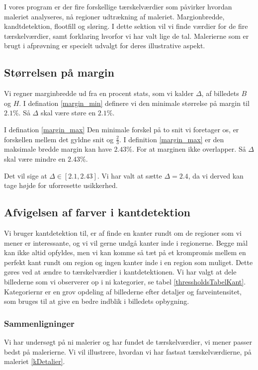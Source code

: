{\sffamily
I vores program er der fire forskellige tærskelværdier som påvirker
hvordan maleriet analyseres, nå regioner udtrækning af maleriet.
Margionbredde, kandtdetektion, flootfill og sløring. I dette sektion vil
vi finde værdier for de fire tærskelværdier, samt forklaring hvorfor vi
har valt lige de tal. Malerierne som er brugt i afprøvning er specielt
udvalgt for deres illustrative aspekt. 
}

\subsection{Størrelsen på margin}
Vi regner marginbredde ud fra en procent stats, som vi kalder $\Delta$, af
billedets $B$ og $H$. I defination \ref{margin_min} definere vi den
minimale størrelse på margin til $2.1 \%$. Så $\Delta$ skal være støre en
$2.1 \%$. 

I defination \ref{margin_max}
Den minimale forskel på to snit vi foretager os, er forskellen mellem
det gyldne snit og $\frac{2}{3}$. I definition \ref{margin_max} er den
maksimale bredde margin kan have $2.43\%$. For at marginen ikke
overlapper. Så $\Delta$ skal være mindre en $2.43\%$. 

Det vil sige at $\Delta \in [2.1, 2.43]$. Vi har valt at
sætte $\Delta = 2.4$, da vi derved kan tage højde for uforresette
usikkerhed.

\subsection{Afvigelsen af farver i kantdetektion}
Vi bruger kantdetektion til, er af finde en kanter rundt om de regioner
som vi mener er interessante, og vi vil gerne undgå kanter inde i
regionerne. Begge mål kan ikke altid opfyldes, men vi kan komme så tæt
på et krompromis mellem en perfekt kant rundt om region og ingen kanter
inde i en region som muliget. Dette gøres ved at ændre to tærskelværdier
i kantdetektionen. Vi har valgt at dele billederne som vi observerer op
i ni kategorier, se tabel \ref{thressholdsTabelKant}. Kategoriernr er en
grov opdeling af billederne efter detaljer og farveintensitet, som
bruges til at give en bedre indblik i billedets opbygning.

\subsubsection{Sammenligninger}
Vi har undersøgt på ni malerier og har fundet de tærskelværdier, vi mener
passer bedst på malerierne. Vi vil illustrere, hvordan vi har fastsat
tærskelværdierne, på maleriet \ref{kDetalier}.

